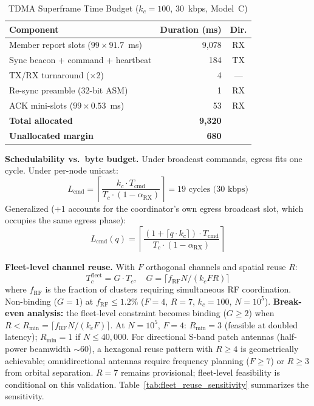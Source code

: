 \documentclass[journal]{IEEEtran}
\begin{document}
\begin{table}[t]
    \centering
    \caption{TDMA Superframe Time Budget ($k_c = 100$, 30~kbps, Model~C)}
    \label{tab:superframe}
    \begin{tabular}{@{}lrc@{}}
        \toprule
        \textbf{Component} & \textbf{Duration (ms)} & \textbf{Dir.} \\
        \midrule
        Member report slots ($99 \times 91.7$~ms) & 9{,}078 & RX \\
        Sync beacon + command + heartbeat & 184 & TX \\
        TX/RX turnaround ($\times$2) & 4 & --- \\
        Re-sync preamble (32-bit ASM) & 1 & RX \\
        ACK mini-slots ($99 \times 0.53$~ms) & 53 & RX \\
        \midrule
        \textbf{Total allocated} & \textbf{9{,}320} & \\
        \textbf{Unallocated margin} & \textbf{680} & \\
        \bottomrule
    \end{tabular}
\end{table}

\textbf{Schedulability vs.\ byte budget.} Under broadcast commands, egress fits one cycle. Under per-node unicast:
\begin{equation}
    L_{\text{cmd}} = \left\lceil \frac{k_c \cdot T_{\text{cmd}}}{T_c \cdot (1 - \alpha_{\text{RX}})} \right\rceil = 19 \text{~cycles (30~kbps)}
    \label{eq:unicast_stagger}
\end{equation}
Generalized ($+1$ accounts for the coordinator's own egress broadcast slot, which occupies the same egress phase):
\begin{equation}
    L_{\text{cmd}}(q) = \left\lceil \frac{(1 + \lceil q \cdot k_c \rceil) \cdot T_{\text{cmd}}}{T_c \cdot (1 - \alpha_{\text{RX}})} \right\rceil
    \label{eq:unicast_stagger_q}
\end{equation}

\textbf{Fleet-level channel reuse.} With $F$ orthogonal channels and spatial reuse $R$:
\begin{equation}
    T_c^{\text{fleet}} = G \cdot T_c, \quad G = \lceil f_{\text{RF}} N / (k_c F R) \rceil
    \label{eq:fleet_reuse}
\end{equation}
where $f_{\text{RF}}$ is the fraction of clusters requiring simultaneous RF coordination. Non-binding ($G = 1$) at $f_{\text{RF}} \leq 1.2\%$ ($F = 4$, $R = 7$, $k_c = 100$, $N = 10^5$). \textbf{Break-even analysis:} the fleet-level constraint becomes binding ($G \geq 2$) when $R < R_{\min} = \lceil f_{\text{RF}} N / (k_c F) \rceil$. At $N = 10^5$, $F = 4$: $R_{\min} = 3$ (feasible at doubled latency); $R_{\min} = 1$ if $N \leq 40{,}000$. For directional S-band patch antennas (half-power beamwidth ${\sim}60$\textdegree), a hexagonal reuse pattern with $R \geq 4$ is geometrically achievable; omnidirectional antennas require frequency planning ($F \geq 7$) or $R \geq 3$ from orbital separation. $R = 7$ remains provisional; fleet-level feasibility is conditional on this validation. Table~\ref{tab:fleet_reuse_sensitivity} summarizes the sensitivity.
\end{document}
